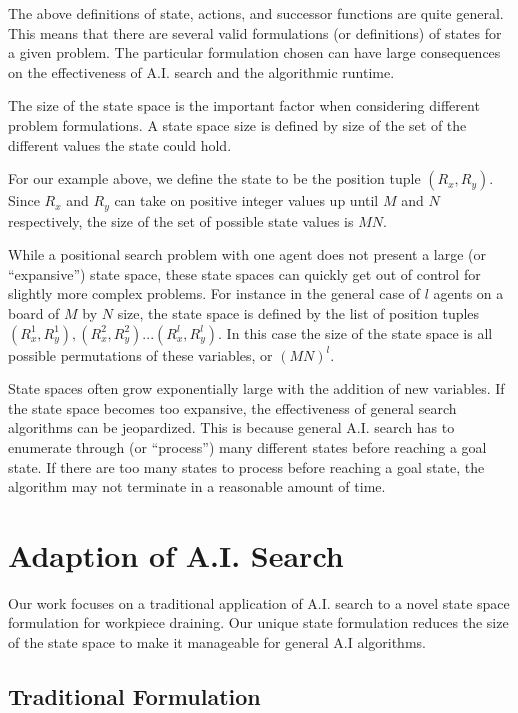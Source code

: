 The above definitions of state, actions, and successor functions are quite general. This means that there are several valid formulations (or definitions) of states for a given problem. The particular formulation chosen can have large consequences on the effectiveness of A.I. search and the algorithmic runtime.


The size of the state space is the important factor when considering different problem formulations. A state space size is defined by size of the set of the different values the state could hold.

For our example above, we define the state to be the position tuple $(R_x, R_y)$. Since $R_x$ and $R_y$ can take on positive integer values up until $M$ and $N$ respectively, the size of the set of possible state values is $MN$.

While a positional search problem with one agent does not present a large (or ``expansive'') state space, these state spaces can quickly get out of control for slightly more complex problems. For instance in the general case of $l$ agents on a board of $M$ by $N$ size, the state space is defined by the list of position tuples $(R^1_x, R^1_y), (R^2_x, R^2_y)... (R^l_x, R^l_y)$. In this case the size of the state space is all possible permutations of these variables, or $(MN)^l$.

State spaces often grow exponentially large with the addition of new variables. If the state space becomes too expansive, the effectiveness of general search algorithms can be jeopardized. This is because general A.I. search has to enumerate through (or ``process'') many different states before reaching a goal state. If there are too many states to process before reaching a goal state, the algorithm may not terminate in a reasonable amount of time.

\section{Adaption of A.I. Search}

Our work focuses on a traditional application of A.I. search to a novel state space formulation for workpiece draining. Our unique state formulation reduces the size of the state space to make it manageable for general A.I algorithms.

	\subsection{Traditional Formulation}

